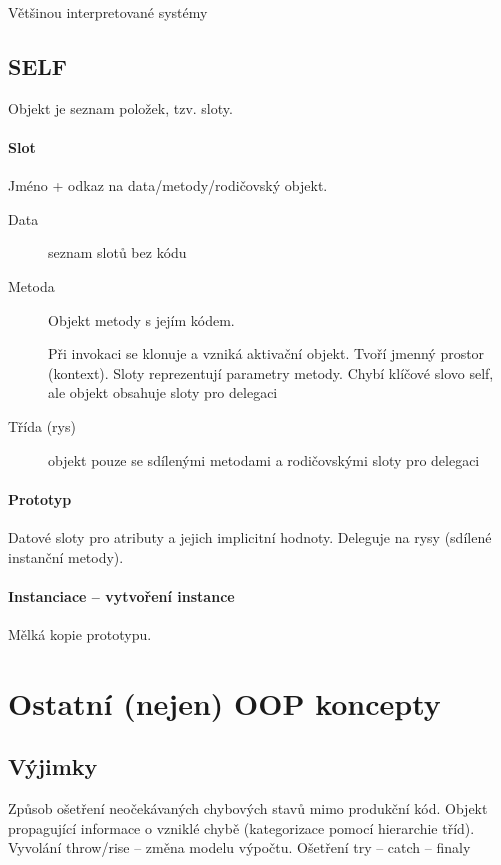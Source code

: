 \documentclass[a4wide]{report}
\begin{document}
Většinou interpretované systémy

\subsection{SELF}

Objekt je seznam položek, tzv. sloty.

\paragraph{Slot} Jméno + odkaz na data/metody/rodičovský objekt.

\begin{description}
	\item[Data] seznam slotů bez kódu
	\item[Metoda] Objekt metody s jejím kódem.
	
	Při invokaci se klonuje a vzniká aktivační objekt. Tvoří jmenný prostor (kontext). Sloty reprezentují parametry metody. Chybí klíčové slovo self, ale objekt obsahuje sloty pro delegaci
	\item[Třída (rys)] objekt pouze se sdílenými metodami a rodičovskými sloty pro delegaci
\end{description}

\paragraph{Prototyp}
Datové sloty pro atributy a jejich implicitní hodnoty. Deleguje na rysy (sdílené instanční metody).

\paragraph{Instanciace -- vytvoření instance}
Mělká kopie prototypu.


\section{Ostatní (nejen) OOP koncepty}

\subsection{Výjimky}
Způsob ošetření neočekávaných chybových stavů mimo produkční kód. Objekt propagující informace o vzniklé chybě (kategorizace pomocí hierarchie tříd). Vyvolání throw/rise -- změna modelu výpočtu. Ošetření try -- catch -- finaly
\end{document}
